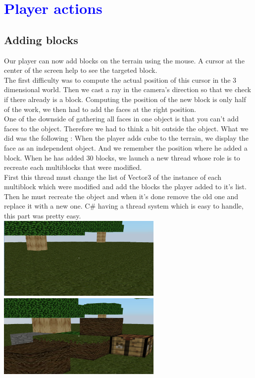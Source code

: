 \documentclass[article]{report}             %
\begin{document}
		\chapter{\textcolor{blue}{Player actions}}
			\section{Adding blocks}
				Our player can now add blocks on the terrain using the mouse. A cursor at the center of the screen help to see the targeted block. \\

The first difficulty was to compute the actual position of this cursor in the 3 dimensional world. Then we cast a ray in the camera's direction so that we check if there already is a block. Computing the position of the new block is only half of the work, we then had to add the faces at the right position.\\

				One of the downside of gathering all faces in one object is that you can't add faces to the object. Therefore we had to think a bit outside the object. What we did was the following : When the player adds cube to the terrain, we display the face as an independent object. And  we remember the position where he added a block. When he has added 30 blocks, we launch a new thread whose role is to recreate each multiblocks that were modified.\\

				First this thread must change the list of Vector3 of the instance of each multiblock which were modified and add the blocks the player added to it's list. Then he must recreate the object and when it's done remove the old one and replace it with a new one. C\# having a thread system which is easy to handle, this part was pretty easy. \\


				\includegraphics[width = 8cm]{images/Graphics/beforeAdd.png}		
				\includegraphics[width = 8cm]{images/Graphics/afterAdd.png} \newpage
\end{document}
